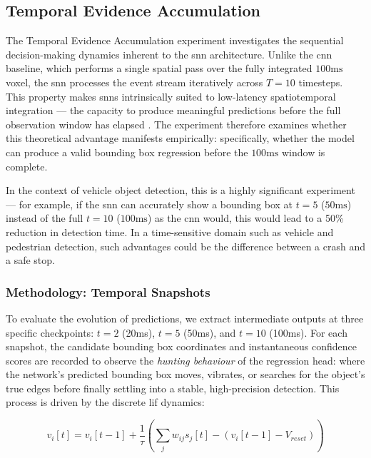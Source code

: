 \subsection{Temporal Evidence Accumulation}
\label{subsec:temporal_evidence}

The Temporal Evidence Accumulation experiment investigates the sequential decision-making dynamics inherent to the \gls{snn} architecture. 
Unlike the \gls{cnn} baseline, which performs a single spatial pass over the fully integrated $100\text{ms}$ voxel, the \gls{snn} processes the event stream iteratively across $T=10$ timesteps. 
This property makes \glspl{snn} intrinsically suited to low-latency spatiotemporal integration --- the capacity 
to produce meaningful predictions before the full observation window has elapsed \cite{pfeiffer_snn_opportunities}. 
The experiment therefore examines whether this theoretical advantage manifests empirically: specifically, whether the 
model can produce a valid bounding box regression before the $100\text{ms}$ window is complete.

In the context of vehicle object detection, this is a highly significant experiment --- for example,
if the \gls{snn} can accurately show a bounding box at $t=5$ ($50\text{ms}$) instead of the full $t=10$ ($100\text{ms}$) as the \gls{cnn} would,
this would lead to a 50\% reduction in detection time. In a time-sensitive domain such as vehicle and pedestrian detection, such advantages could be the difference between a crash and a safe stop.

\subsubsection{Methodology: Temporal Snapshots}
To evaluate the evolution of predictions, we extract intermediate outputs at three specific checkpoints: $t=2$ (20ms), $t=5$ (50ms), and $t=10$ (100ms). 
For each snapshot, the candidate bounding box coordinates and instantaneous confidence scores are recorded to observe the \textit{hunting behaviour} of the regression head:
where the network's predicted bounding box moves, vibrates, or searches for the object's true edges before finally settling into a stable, high-precision detection. 
This process is driven by the discrete \gls{lif} dynamics:

\begin{equation}
    v_i[t] = v_i[t-1] + \frac{1}{\tau} \left( \sum_j w_{ij}s_j[t] - (v_i[t-1] - V_{reset}) \right)
\end{equation}

